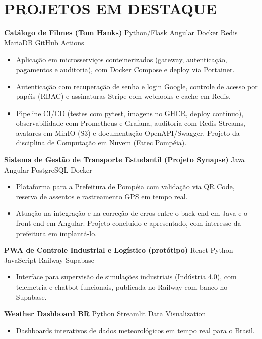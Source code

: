 \documentclass[9pt,a4paper]{extarticle}
\newcommand{\projtitle}[2]{\vspace{2pt}\noindent\textbf{#1} {\color{gray}\textperiodcentered{} #2}\par}
\begin{document}
\section*{PROJETOS EM DESTAQUE}
\projtitle{Catálogo de Filmes (Tom Hanks)}{Python/Flask \textperiodcentered{} Angular \textperiodcentered{} Docker \textperiodcentered{} Redis \textperiodcentered{} MariaDB \textperiodcentered{} GitHub Actions}
\begin{itemize}
  \item Aplicação em microsserviços conteinerizados (gateway, autenticação, pagamentos e auditoria), com Docker Compose e deploy via Portainer.
  \item Autenticação com recuperação de senha e login Google, controle de acesso por papéis (RBAC) e assinaturas Stripe com webhooks e cache em Redis.
  \item Pipeline CI/CD (testes com pytest, imagens no GHCR, deploy contínuo), observabilidade com Prometheus e Grafana, auditoria com Redis Streams, avatares em MinIO (S3) e documentação OpenAPI/Swagger. Projeto da disciplina de Computação em Nuvem (Fatec Pompéia).
\end{itemize}
\projtitle{Sistema de Gestão de Transporte Estudantil (Projeto Synapse)}{Java \textperiodcentered{} Angular \textperiodcentered{} PostgreSQL \textperiodcentered{} Docker}
\begin{itemize}
  \item Plataforma para a Prefeitura de Pompéia com validação via QR Code, reserva de assentos e rastreamento GPS em tempo real.
  \item Atuação na integração e na correção de erros entre o back-end em Java e o front-end em Angular. Projeto concluído e apresentado, com interesse da prefeitura em implantá-lo.
\end{itemize}
\projtitle{PWA de Controle Industrial e Logístico (protótipo)}{React \textperiodcentered{} Python \textperiodcentered{} JavaScript \textperiodcentered{} Railway \textperiodcentered{} Supabase}
\begin{itemize}
  \item Interface para supervisão de simulações industriais (Indústria 4.0), com telemetria e chatbot funcionais, publicada no Railway com banco no Supabase.
\end{itemize}
\projtitle{Weather Dashboard BR}{Python \textperiodcentered{} Streamlit \textperiodcentered{} Data Visualization}
\begin{itemize}
  \item Dashboards interativos de dados meteorológicos em tempo real para o Brasil.
\end{itemize}
\end{document}
